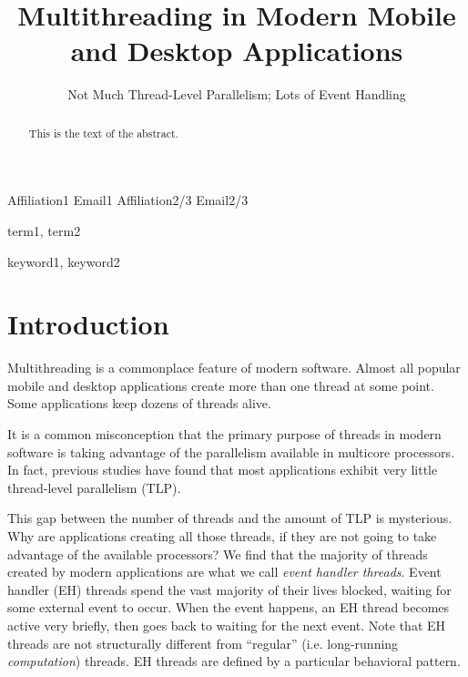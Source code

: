 \documentclass[11pt]{sigplanconf}
\begin{document}
\setlength{\pdfpageheight}{\paperheight}
\setlength{\pdfpagewidth}{\paperwidth}



\title{Multithreading in Modern Mobile and Desktop Applications}
\subtitle{Not Much Thread-Level Parallelism; Lots of Event Handling}

           {Affiliation1}
           {Email1}
           {Affiliation2/3}
           {Email2/3}

\maketitle

\begin{abstract}
This is the text of the abstract.
\end{abstract}


\terms
term1, term2

\keywords
keyword1, keyword2

\section{Introduction}

Multithreading is a commonplace feature of modern software.  Almost all
popular mobile and desktop applications create more than one thread at
some point.  Some applications keep dozens of threads alive.

It is a common misconception that the primary purpose of threads in
modern software is taking advantage of the parallelism available in
multicore processors.  In fact, previous studies have found that most
applications exhibit very little thread-level parallelism (TLP).

This gap between the number of threads and the amount of TLP is
mysterious.  Why are applications creating all those threads, if they
are not going to take advantage of the available processors?  We find
that the majority of threads created by modern applications are what we
call \emph{event handler threads}.  Event handler (EH) threads spend the
vast majority of their lives blocked, waiting for some external event to
occur.  When the event happens, an EH thread becomes active very
briefly, then goes back to waiting for the next event.  Note that EH
threads are not structurally different from ``regular''
(i.e. long-running \emph{computation}) threads.  EH threads are defined
by a particular behavioral pattern.
\end{document}
